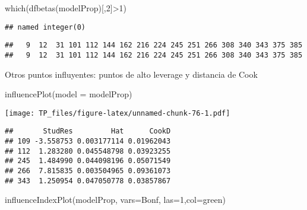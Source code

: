 \documentclass[
]{article}
\newenvironment{Shaded}{\begin{snugshade}}{\end{snugshade}}
\newcommand{\AttributeTok}[1]{\textcolor[rgb]{0.77,0.63,0.00}{#1}}
\newcommand{\DecValTok}[1]{\textcolor[rgb]{0.00,0.00,0.81}{#1}}
\newcommand{\FunctionTok}[1]{\textcolor[rgb]{0.00,0.00,0.00}{#1}}
\newcommand{\NormalTok}[1]{#1}
\newcommand{\OtherTok}[1]{\textcolor[rgb]{0.56,0.35,0.01}{#1}}
\newcommand{\SpecialCharTok}[1]{\textcolor[rgb]{0.00,0.00,0.00}{#1}}
\newcommand{\StringTok}[1]{\textcolor[rgb]{0.31,0.60,0.02}{#1}}
\begin{document}
\begin{Shaded}
\begin{Highlighting}[]
\FunctionTok{which}\NormalTok{(}\FunctionTok{dfbetas}\NormalTok{(modelProp)[,}\DecValTok{2}\NormalTok{]}\SpecialCharTok{\textgreater{}}\DecValTok{1}\NormalTok{)}
\end{Highlighting}
\end{Shaded}

\begin{verbatim}
## named integer(0)
\end{verbatim}

\begin{Shaded}
\end{Shaded}

\begin{verbatim}
##   9  12  31 101 112 144 162 216 224 245 251 266 308 340 343 375 385 
##   9  12  31 101 112 144 162 216 224 245 251 266 308 340 343 375 385
\end{verbatim}

Otros puntos influyentes: puntos de alto leverage y distancia de Cook

\begin{Shaded}
\begin{Highlighting}[]
\FunctionTok{influencePlot}\NormalTok{(}\AttributeTok{model =}\NormalTok{ modelProp)}
\end{Highlighting}
\end{Shaded}

\texttt{[image: TP\_files/figure-latex/unnamed-chunk-76-1.pdf]}

\begin{verbatim}
##       StudRes         Hat      CookD
## 109 -3.558753 0.003177114 0.01962043
## 112  1.283280 0.045548798 0.03923255
## 245  1.484990 0.044098196 0.05071549
## 266  7.815835 0.003504965 0.09361073
## 343  1.250954 0.047050778 0.03857867
\end{verbatim}

\begin{Shaded}
\begin{Highlighting}[]
\FunctionTok{influenceIndexPlot}\NormalTok{(modelProp, }\AttributeTok{vars=}\StringTok{\textquotesingle{}Bonf\textquotesingle{}}\NormalTok{, }\AttributeTok{las=}\DecValTok{1}\NormalTok{,}\AttributeTok{col=}\StringTok{\textquotesingle{}green\textquotesingle{}}\NormalTok{)}
\end{Highlighting}
\end{Shaded}
\end{document}
